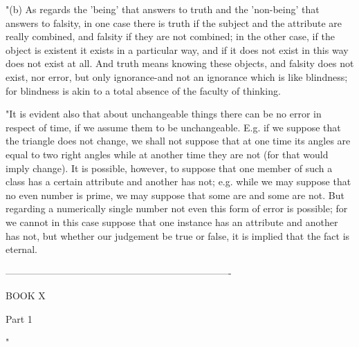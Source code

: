 "(b) As regards the 'being' that answers to truth and the 'non-being'
that answers to falsity, in one case there is truth if the subject
and the attribute are really combined, and falsity if they are not
combined; in the other case, if the object is existent it exists in
a particular way, and if it does not exist in this way does not exist
at all. And truth means knowing these objects, and falsity does not
exist, nor error, but only ignorance-and not an ignorance which is
like blindness; for blindness is akin to a total absence of the faculty
of thinking. 

"It is evident also that about unchangeable things there can be no
error in respect of time, if we assume them to be unchangeable. E.g.
if we suppose that the triangle does not change, we shall not suppose
that at one time its angles are equal to two right angles while at
another time they are not (for that would imply change). It is possible,
however, to suppose that one member of such a class has a certain
attribute and another has not; e.g. while we may suppose that no even
number is prime, we may suppose that some are and some are not. But
regarding a numerically single number not even this form of error
is possible; for we cannot in this case suppose that one instance
has an attribute and another has not, but whether our judgement be
true or false, it is implied that the fact is eternal. 

----------------------------------------------------------------------

BOOK X

Part 1 

"

